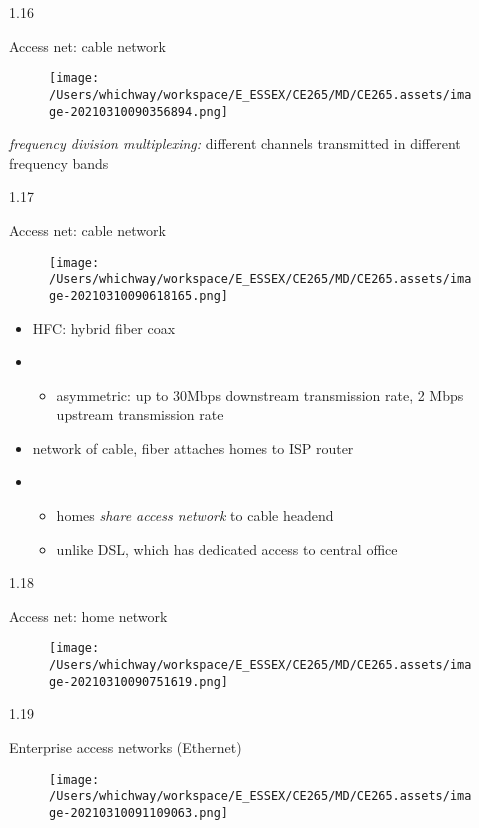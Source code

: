 \documentclass[
]{article}
\begin{document}
1.16

Access net: cable network

\begin{figure}
\centering
\texttt{[image: /Users/whichway/workspace/E\_ESSEX/CE265/MD/CE265.assets/image-20210310090356894.png]}
\caption{}
\end{figure}

\emph{frequency division multiplexing:} different channels transmitted
in different frequency bands

1.17

Access net: cable network

\begin{figure}
\centering
\texttt{[image: /Users/whichway/workspace/E\_ESSEX/CE265/MD/CE265.assets/image-20210310090618165.png]}
\caption{}
\end{figure}

\begin{itemize}
\item
  HFC: hybrid fiber coax
\item
  \begin{itemize}
  \item
    asymmetric: up to 30Mbps downstream transmission rate, 2 Mbps
    upstream transmission rate
  \end{itemize}
\item
  network of cable, fiber attaches homes to ISP router
\item
  \begin{itemize}
  \item
    homes \emph{share access network} to cable headend
  \item
    unlike DSL, which has dedicated access to central office
  \end{itemize}
\end{itemize}

1.18

Access net: home network

\begin{figure}
\centering
\texttt{[image: /Users/whichway/workspace/E\_ESSEX/CE265/MD/CE265.assets/image-20210310090751619.png]}
\caption{}
\end{figure}

1.19

Enterprise access networks (Ethernet)

\begin{figure}
\centering
\texttt{[image: /Users/whichway/workspace/E\_ESSEX/CE265/MD/CE265.assets/image-20210310091109063.png]}
\caption{}
\end{figure}
\end{document}
